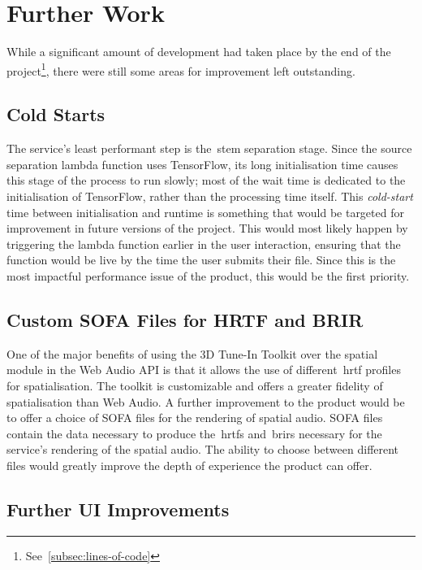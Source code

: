 \thispagestyle{plain}
\newpage
\section{Further Work}\label{sec:further-work}

\normalsize

While a significant amount of development had taken place by the end of the project\footnote{See~\ref{subsec:lines-of-code}},
there were still some areas for improvement left outstanding.

\subsection{Cold Starts}\label{subsec:cold-starts}

The service's least performant step is the~\gls{stem} separation stage.
Since the source separation lambda function uses TensorFlow,
its long initialisation time causes this stage of the process
to run slowly;
most of the wait time is dedicated to the initialisation of TensorFlow,
rather than the processing time itself.
This \textit{cold-start}
time between initialisation and runtime is something
that would be targeted for improvement in future versions of the project.
This would most likely happen
by triggering the lambda function earlier in the user interaction,
ensuring that the function would be live by the time the user submits their file.
Since this is the most impactful performance issue of the product, this would be the first priority.

\subsection{Custom SOFA Files for HRTF and BRIR}\label{subsec:custom-hrtf-and-hrir-files}

One of the major benefits
of using the 3D Tune-In Toolkit over the spatial module in the Web Audio API is that it allows the use of different~\gls{hrtf} profiles for spatialisation.
The toolkit is customizable and offers a greater fidelity of spatialisation than Web Audio.
A further improvement to the product would be
to offer a choice of SOFA files for the rendering of spatial audio.
SOFA files contain the data necessary to produce the~\glspl{hrtf} and~\glspl{brir} necessary for the service's rendering of the spatial audio.
The ability to choose between different files would greatly improve the depth of experience the product can offer.

\subsection{Further UI Improvements}\label{subsec:ui-improvements}

